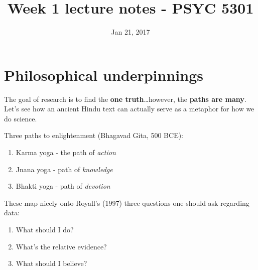 \documentclass[11pt]{article}
\date{Jan 21, 2017}
\title{Week 1 lecture notes - PSYC 5301}
\begin{document}
\maketitle


\section*{Philosophical underpinnings}
\label{sec-1}
The goal of research is to find the \textbf{one truth}\ldots{}however, the \textbf{paths are many}.  Let's see how an ancient Hindu text can actually serve as a metaphor for how we do science.

Three paths to enlightenment (Bhagavad Gita, 500 BCE):
\begin{enumerate}
\item Karma yoga - the path of \emph{action}
\item Jnana yoga - path of \emph{knowledge}
\item Bhakti yoga - path of \emph{devotion}
\end{enumerate}

These map nicely onto Royall's (1997) three questions one should ask regarding data:
\begin{enumerate}
\item What should I do?
\item What's the relative evidence?
\item What should I believe?
\end{enumerate}
\end{document}
